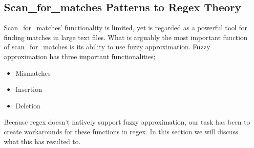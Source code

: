 
\subsection{Scan\_for\_matches Patterns to Regex Theory}
Scan\_for\_matches' functionality is limited, yet is regarded as a powerful tool 
for finding matches in large text files. What is arguably the most important 
function of scan\_for\_matches is its ability to use fuzzy approximation. 
Fuzzy approximation has three important functionalities; 
\begin{itemize}
\item Mismatches
\item Insertion
\item Deletion
\end{itemize}
Because regex doesn't natively support fuzzy approximation, our task has been 
to create workarounds for these functions in regex. 
In this section we will discuss what this has resulted to.

